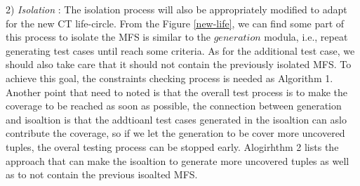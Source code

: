 \documentclass{sig-alternate}
\begin{document}

2) \emph{Isolation} :
The isolation process will also be appropriately modified to adapt for the new CT life-circle. From the Figure \ref{new-life}, we can find some part of this process to isolate the MFS is similar to the $generation$ modula, i.e., repeat generating test cases until reach some criteria. As for the additional test case, we should also take care that it should not contain the previously isolated MFS. To achieve this goal, the constraints checking process is needed as Algorithm 1. Another point that need to noted is that the overall test process is to make the coverage to be reached as soon as possible, the connection between generation and isoaltion is that the addtioanl test cases generated in the isoaltion can aslo contribute the coverage, so if we let the generation to be cover more uncovered tuples, the overal testing process can be stopped early. Alogirhthm 2 lists the approach that can make the isoaltion to generate more uncovered tuples as well as to not contain the previous isoalted MFS.
\end{document}
